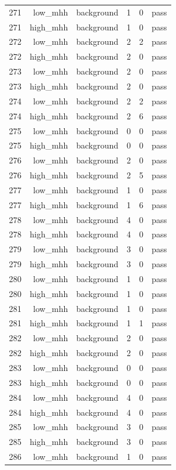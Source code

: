 \begin{table}[htbp]
{\begin{tabular}{lrrrrr}
271 & low\_mhh & background & 1 & 0 & pass \\
271 & high\_mhh & background & 1 & 0 & pass \\
272 & low\_mhh & background & 2 & 2 & pass \\
272 & high\_mhh & background & 2 & 0 & pass \\
273 & low\_mhh & background & 2 & 0 & pass \\
273 & high\_mhh & background & 2 & 0 & pass \\
274 & low\_mhh & background & 2 & 2 & pass \\
274 & high\_mhh & background & 2 & 6 & pass \\
275 & low\_mhh & background & 0 & 0 & pass \\
275 & high\_mhh & background & 0 & 0 & pass \\
276 & low\_mhh & background & 2 & 0 & pass \\
276 & high\_mhh & background & 2 & 5 & pass \\
277 & low\_mhh & background & 1 & 0 & pass \\
277 & high\_mhh & background & 1 & 6 & pass \\
278 & low\_mhh & background & 4 & 0 & pass \\
278 & high\_mhh & background & 4 & 0 & pass \\
279 & low\_mhh & background & 3 & 0 & pass \\
279 & high\_mhh & background & 3 & 0 & pass \\
280 & low\_mhh & background & 1 & 0 & pass \\
280 & high\_mhh & background & 1 & 0 & pass \\
281 & low\_mhh & background & 1 & 0 & pass \\
281 & high\_mhh & background & 1 & 1 & pass \\
282 & low\_mhh & background & 2 & 0 & pass \\
282 & high\_mhh & background & 2 & 0 & pass \\
283 & low\_mhh & background & 0 & 0 & pass \\
283 & high\_mhh & background & 0 & 0 & pass \\
284 & low\_mhh & background & 4 & 0 & pass \\
284 & high\_mhh & background & 4 & 0 & pass \\
285 & low\_mhh & background & 3 & 0 & pass \\
285 & high\_mhh & background & 3 & 0 & pass \\
286 & low\_mhh & background & 1 & 0 & pass \\

\end{tabular}}
\end{table}
